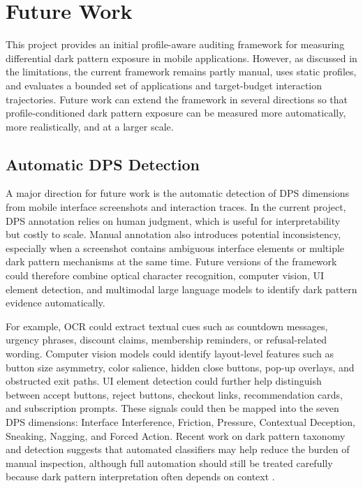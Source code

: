 \chapter{Future Work}

This project provides an initial profile-aware auditing framework for measuring differential dark pattern exposure in mobile applications. However, as discussed in the limitations, the current framework remains partly manual, uses static profiles, and evaluates a bounded set of applications and target-budget interaction trajectories. Future work can extend the framework in several directions so that profile-conditioned dark pattern exposure can be measured more automatically, more realistically, and at a larger scale.

\section{Automatic DPS Detection}

A major direction for future work is the automatic detection of DPS dimensions from mobile interface screenshots and interaction traces. In the current project, DPS annotation relies on human judgment, which is useful for interpretability but costly to scale. Manual annotation also introduces potential inconsistency, especially when a screenshot contains ambiguous interface elements or multiple dark pattern mechanisms at the same time. Future versions of the framework could therefore combine optical character recognition, computer vision, UI element detection, and multimodal large language models to identify dark pattern evidence automatically.

For example, OCR could extract textual cues such as countdown messages, urgency phrases, discount claims, membership reminders, or refusal-related wording. Computer vision models could identify layout-level features such as button size asymmetry, color salience, hidden close buttons, pop-up overlays, and obstructed exit paths. UI element detection could further help distinguish between accept buttons, reject buttons, checkout links, recommendation cards, and subscription prompts. These signals could then be mapped into the seven DPS dimensions: Interface Interference, Friction, Pressure, Contextual Deception, Sneaking, Nagging, and Forced Action. Recent work on dark pattern taxonomy and detection suggests that automated classifiers may help reduce the burden of manual inspection, although full automation should still be treated carefully because dark pattern interpretation often depends on context \cite{li2024comprehensive,mathur2019darkpatterns}.

